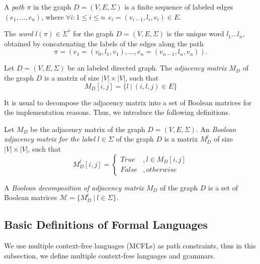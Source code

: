\begin{definition}
A \emph{path} $\pi$ in the graph $D = (V, E, \Sigma)$ is a finite sequence of labeled edges $(e_1, ..., e_{n})$, where $\forall i: 1 \leq i \leq n \ \ e_i=(v_{i - 1},l_i, v_{i}) \in E$.
\end{definition}

\begin{definition}
	The \emph{word} $l(\pi) \in \Sigma^*$ for the graph $D=(V, E, \Sigma)$ is the unique word $l_1 ... l_n$, obtained by concatenating the labels of the edges along the path $$\pi = (e_1 = (v_0, l_1, v_1), \ldots, e_n = (v_{n-1}, l_n, v_n)).$$
\end{definition}


\begin{definition}
    Let $D = (V, E, \Sigma)$ be an labeled directed graph. The \emph{adjacency matrix} $M_D$ of the graph $D$ is a matrix of size $|V| \times |V|$, such that 
    \begin{equation*}
        M_D[i,j] = \{l~|~(i, l, j) \in E\}
    \end{equation*}
\end{definition}

It is usual to decompose the adjacency matrix into a set of Boolean matrices for the implementation reasons. Thus, we introduce the following definitions.

\begin{definition}
    Let $M_D$ be the adjacency matrix of the graph $D = (V, E, \Sigma)$. An \emph{Boolean adjacency matrix for the label} $l \in \Sigma$ of the graph $D$ is a matrix $M_D^l$ of size $|V| \times |V|$, such that 
    \begin{equation*}
        M_D^l[i,j] = \begin{cases}
                        True &, l \in M_D[i,j]\\
                        False &, otherwise
                    \end{cases}
    \end{equation*}
\end{definition}

\begin{definition}
    A \emph{Boolean decomposition of adjacency matrix} $M_D$ of the graph $D$ is a set of Boolean matrices $\mathcal{M} = \{M_D^l~|~l \in \Sigma\}$.
\end{definition}

\subsection{Basic Definitions of Formal Languages}
We use multiple context-free languages (MCFLs) as path constraints, thus in this subsection, we define multiple context-free languages and grammars.

